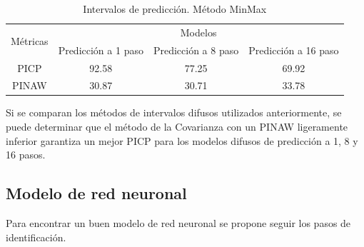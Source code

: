 \documentclass[12pt]{article}
\begin{document}
\begin{itemize}
\begin{table}[htbp]
  \centering
  \caption{Intervalos de predicción. Método MinMax}
\begin{tabular}{|c|c|c|c|}
	\hline
	\multirow{2}{*}{Métricas} & \multicolumn{3}{c|}{Modelos}                                     \\ \cline{2-4}
	& Predicción a 1 paso & Predicción a 8 paso & Predicción a 16 paso \\ \hline
	PICP                      & 92.58               & 77.25               & 69.92                \\ \hline
	PINAW                     & 30.87               & 30.71             & 33.78                \\ \hline
\end{tabular}
  \label{tab:addlabel}%
\end{table}%


\end{itemize}

Si se comparan los métodos de intervalos difusos utilizados anteriormente, se puede determinar que el método de la Covarianza con un PINAW ligeramente inferior garantiza un mejor PICP para los modelos difusos de predicción a 1, 8 y 16 pasos.

\clearpage
\newpage
\subsection{Modelo de red neuronal}

Para encontrar un buen modelo de red neuronal se propone seguir los pasos de identificación.
\end{document}
